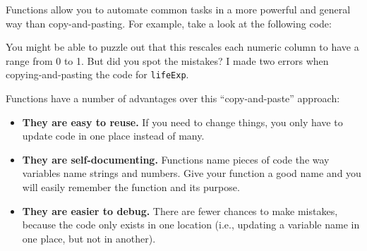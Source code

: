 \documentclass[]{book}
\newenvironment{Shaded}{\begin{snugshade}}{\end{snugshade}}
\newcommand{\KeywordTok}[1]{\textcolor[rgb]{0.13,0.29,0.53}{\textbf{#1}}}
\newcommand{\DataTypeTok}[1]{\textcolor[rgb]{0.13,0.29,0.53}{#1}}
\newcommand{\StringTok}[1]{\textcolor[rgb]{0.31,0.60,0.02}{#1}}
\newcommand{\OperatorTok}[1]{\textcolor[rgb]{0.81,0.36,0.00}{\textbf{#1}}}
\newcommand{\NormalTok}[1]{#1}
\begin{document}
Functions allow you to automate common tasks in a more powerful and
general way than copy-and-pasting. For example, take a look at the
following code:

\begin{Shaded}
\end{Shaded}

You might be able to puzzle out that this rescales each numeric column
to have a range from 0 to 1. But did you spot the mistakes? I made two
errors when copying-and-pasting the code for \texttt{lifeExp}.

Functions have a number of advantages over this ``copy-and-paste''
approach:

\begin{itemize}
\item
  \textbf{They are easy to reuse.} If you need to change things, you
  only have to update code in one place instead of many.
\item
  \textbf{They are self-documenting.} Functions name pieces of code the
  way variables name strings and numbers. Give your function a good name
  and you will easily remember the function and its purpose.
\item
  \textbf{They are easier to debug.} There are fewer chances to make
  mistakes, because the code only exists in one location (i.e., updating
  a variable name in one place, but not in another).
\end{itemize}
\end{document}
